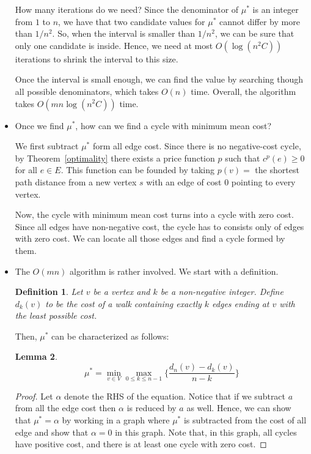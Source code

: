 \documentclass[10pt]{article}
\newtheorem{lemma}{Lemma}[section]
\newtheorem{definition}[lemma]{Definition}
\begin{document}
\begin{itemize}
        How many iterations do we need? Since the denominator
        of $\mu^*$ is an integer from $1$ to $n$, we have that
        two candidate values for $\mu^*$ cannot differ by
        more than $1/n^2$. So, when the interval is smaller
        than $1/n^2$, we can be sure that only one candidate
        is inside. Hence, we need at most $O(\log(n^2C))$
        iterations to shrink the interval to this size.
        
        Once the interval is small enough, we can find the value by 
        searching though all possible denominators, which takes 
        $O(n)$ time. Overall, the algorithm takes $O(mn \log (n^2C))$
        time.
      
      \item Once we find $\mu^*$, how can we find a cycle
        with minimum mean cost?
        
        We first subtract $\mu^*$ form all edge cost.
        Since there is no negative-cost cycle,
        by Theorem~\ref{optimality}
        there exists a price function $p$ such that
        $c^p(e) \geq 0$ for all $e \in E.$
        This function can be founded by taking
        $p(v) = $ the shortest path distance
        from a new vertex $s$ with an edge of cost $0$
        pointing to every vertex.
        
        Now, the cycle with minimum mean cost 
        turns into a cycle with zero cost.
        Since all edges have non-negative cost,
        the cycle has to consists only of edges
        with zero cost. We can locate all those edges
        and find a cycle formed by them.
        
      \item The $O(mn)$ algorithm is rather involved. We start
        with a definition.
        \begin{definition}
          Let $v$ be a vertex and $k$ be a non-negative integer.
          Define $d_k(v)$ to be the cost of a walk
          containing exactly $k$ edges ending at $v$
          with the least possible cost.
        \end{definition}
        Then, $\mu^*$ can be characterized as follows:
        \begin{lemma} \label{min-mean-cost-characterization}
          $$\mu^* = \min_{v \in V} \max_{0 \leq k \leq n-1} \Bigg\{ \frac{d_n(v) - d_k(v)}{n - k} \Bigg\}$$
        \end{lemma}
        \begin{proof}
          Let $\alpha$ denote the RHS of the equation. 
          Notice that if we subtract $a$ from all the edge cost
          then $\alpha$ is reduced by $a$ as well.
          Hence, we  can show that $\mu^* = \alpha$ by working 
          in a graph where $\mu^*$ is subtracted from the cost of 
          all edge and show that $\alpha = 0$ in this graph.
          Note that, in this graph, all cycles have positive cost,
          and there is at least one cycle with zero cost. \medskip
          

\end{proof}
\end{itemize}
\end{document}

